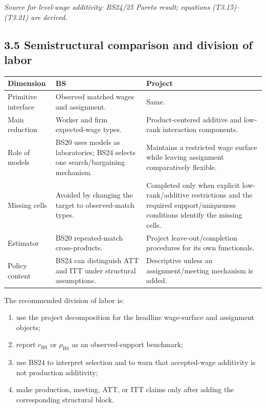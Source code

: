 \documentclass[11pt]{article}
\begin{document}
\textit{Source for level-wage additivity: BS24/25 Pareto result; equations
(T3.15)--(T3.21) are derived.}

\subsection{3.5 Semistructural comparison and division of labor}

\begin{longtable}{p{}p{}p{}}
\textbf{Dimension} & \textbf{BS} & \textbf{Project} \\
\hline
Primitive interface & Observed matched wages and assignment. & Same. \\
Main reduction & Worker and firm expected-wage types. & Product-centered
additive and low-rank interaction components. \\
Role of models & BS20 uses models as laboratories; BS24 selects one
search/bargaining mechanism. & Maintains a restricted wage surface while
leaving assignment comparatively flexible. \\
Missing cells & Avoided by changing the target to observed-match types. &
Completed only when explicit low-rank/additive restrictions and the required
support/uniqueness conditions identify the missing cells. \\
Estimator & BS20 repeated-match cross-products. & Project leave-out/completion
procedures for its own functionals. \\
Policy content & BS24 can distinguish ATT and ITT under structural
assumptions. & Descriptive unless an assignment/meeting mechanism is added. \\
\end{longtable}

The recommended division of labor is:

\begin{enumerate}
\item use the project decomposition for the headline wage-surface and
  assignment objects;
\item report \(c_{\mathrm{BS}}\) or \(\rho_{\mathrm{BS}}\) as an
  observed-support benchmark;
\item use BS24 to interpret selection and to warn that accepted-wage
  additivity is not production additivity;
\item make production, meeting, ATT, or ITT claims only after adding the
  corresponding structural block.
\end{enumerate}
\end{document}
